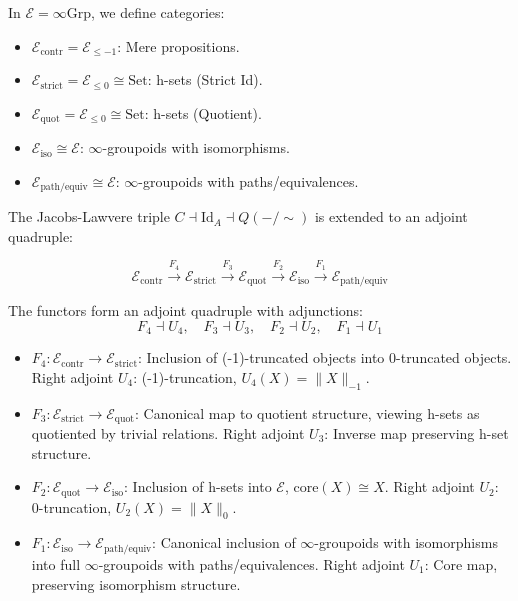 \documentclass{article}
\begin{document}
In $\mathcal{E} = \infty\text{Grp}$, we define categories:
\begin{itemize}
    \item $\mathcal{E}_{\text{contr}} = \mathcal{E}_{\leq -1}$: Mere propositions.
    \item $\mathcal{E}_{\text{strict}} = \mathcal{E}_{\leq 0} \cong \text{Set}$: h-sets (Strict Id).
    \item $\mathcal{E}_{\text{quot}} = \mathcal{E}_{\leq 0} \cong \text{Set}$: h-sets (Quotient).
    \item $\mathcal{E}_{\text{iso}} \cong \mathcal{E}$: $\infty$-groupoids with isomorphisms.
    \item $\mathcal{E}_{\text{path/equiv}} \cong \mathcal{E}$: $\infty$-groupoids with paths/equivalences.
\end{itemize}

\newpage
The Jacobs-Lawvere triple $C \dashv \text{Id}_A \dashv Q(-/\sim)$ is extended to an adjoint quadruple:

\[
\mathcal{E}_{\text{contr}} \xrightarrow{F_4} \mathcal{E}_{\text{strict}} \xrightarrow{F_3} \mathcal{E}_{\text{quot}} \xrightarrow{F_2} \mathcal{E}_{\text{iso}} \xrightarrow{F_1} \mathcal{E}_{\text{path/equiv}}
\]

\begin{theorem}
The functors form an adjoint quadruple with adjunctions:
\[
F_4 \dashv U_4, \quad F_3 \dashv U_3, \quad F_2 \dashv U_2, \quad F_1 \dashv U_1
\]
\end{theorem}

\begin{itemize}
    \item \textbf{$F_4: \mathcal{E}_{\text{contr}} \to \mathcal{E}_{\text{strict}}$}: Inclusion of (-1)-truncated objects into 0-truncated objects. Right adjoint $U_4$: (-1)-truncation, $U_4(X) = \|X\|_{-1}$.
    \item \textbf{$F_3: \mathcal{E}_{\text{strict}} \to \mathcal{E}_{\text{quot}}$}: Canonical map to quotient structure, viewing h-sets as quotiented by trivial relations. Right adjoint $U_3$: Inverse map preserving h-set structure.
    \item \textbf{$F_2: \mathcal{E}_{\text{quot}} \to \mathcal{E}_{\text{iso}}$}: Inclusion of h-sets into $\mathcal{E}$, $\text{core}(X) \cong X$. Right adjoint $U_2$: 0-truncation, $U_2(X) = \|X\|_0$.
    \item \textbf{$F_1: \mathcal{E}_{\text{iso}} \to \mathcal{E}_{\text{path/equiv}}$}: Canonical inclusion of $\infty$-groupoids with isomorphisms into full $\infty$-groupoids with paths/equivalences. Right adjoint $U_1$: Core map, preserving isomorphism structure.
\end{itemize}
\end{document}
